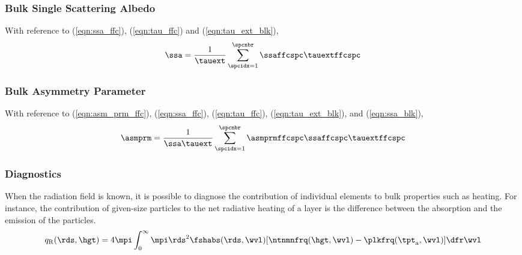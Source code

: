 \documentclass[12pt]{article}
\begin{document}
\subsubsection[Bulk Single Scattering Albedo]{Bulk Single Scattering Albedo}\label{sxn:ssa_blk}
With reference to (\ref{eqn:ssa_ffc}), (\ref{eqn:tau_ffc}) and
(\ref{eqn:tau_ext_blk}), 
\begin{equation}
\ssa = \frac{1}{\tauext} \sum_{\spcidx = 1}^{\spcnbr} \ssaffcspc \tauextffcspc
\label{eqn:ssa_blk}
\end{equation}

\subsubsection[Bulk Asymmetry Parameter]{Bulk Asymmetry Parameter}\label{sxn:asm_prm_blk}
With reference to (\ref{eqn:asm_prm_ffc}), (\ref{eqn:ssa_ffc}),
(\ref{eqn:tau_ffc}), (\ref{eqn:tau_ext_blk}), and (\ref{eqn:ssa_blk}),
\begin{equation}
\asmprm = \frac{1}{\ssa \tauext} \sum_{\spcidx = 1}^{\spcnbr} \asmprmffcspc \ssaffcspc \tauextffcspc
\label{eqn:asm_prm_blk}
\end{equation}

\subsubsection[Diagnostics]{Diagnostics}\label{sxn:dgn_blk}
When the radiation field is known, it is possible to diagnose the
contribution of individual elements to bulk properties such as
heating.  
For instance, the contribution of given-size particles to the net
radiative heating of a layer is the difference between the absorption
and the emission of the particles.
\begin{equation}
q_{\rm R}(\rds,\hgt) = 4\mpi \int_{0}^{\infty} \mpi \rds^{2} 
\fshabs(\rds,\wvl)
[\ntnmnfrq(\hgt,\wvl) - \plkfrq(\tpt_{\rm a},\wvl)] \dfr\wvl
\label{eqn:qrad_dfn}
\end{equation}

\end{document}

